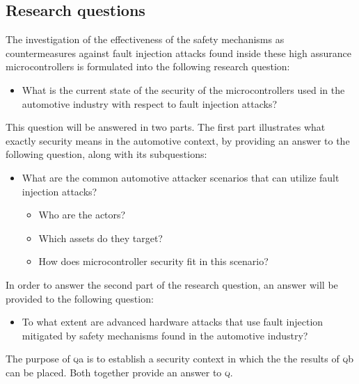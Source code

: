 \documentclass[10pt]{article}
\newcommand{\Q}{\textsc{q}\xspace}
\newcommand{\Qa}{\textsc{q}a\xspace}
\newcommand{\Qb}{\textsc{q}b\xspace}
\begin{document}
    


  \newpage
  \subsection{Research questions }
  \label{sec:questions}

    The investigation of the effectiveness of the safety mechanisms as countermeasures against fault injection attacks found inside these high assurance microcontrollers is formulated into the following research question: 

    \begin{itemize}
      \item[\Q :] What is the current state of the security of the microcontrollers used in the automotive industry with respect to fault injection attacks?
    \end{itemize}

    \noindent This question will be answered in two parts. The first part illustrates what exactly security means in the automotive context, by providing an answer to the following question, along with its subquestions:

    \begin{itemize}
      \item[\Qa :] What are the common automotive attacker scenarios that can utilize fault injection attacks?
      \begin{itemize}
        \item Who are the actors?
        \item Which assets do they target?
        \item How does microcontroller security fit in this scenario?
      \end{itemize}
    \end{itemize}

    \noindent In order to answer the second part of the research question, an answer will be provided to the following question:

    \begin{itemize}
      \item[\Qb :] To what extent are advanced hardware attacks that use fault injection mitigated by safety mechanisms found in the automotive industry?
    \end{itemize}

    \noindent The purpose of \Qa is to establish a security context in which the the results of \Qb can be placed. Both together provide an answer to \Q. 
\end{document}
